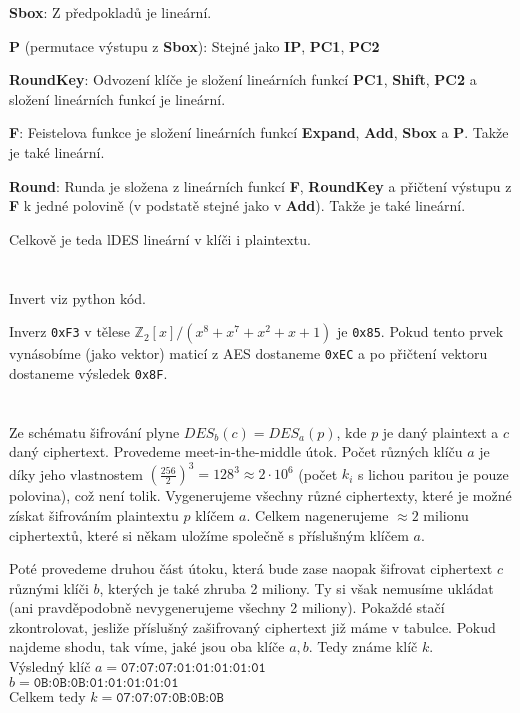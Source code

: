 \documentclass[12pt, a4paper]{article}
\begin{document}
\textbf{Sbox}: Z předpokladů je lineární.

\textbf{P} (permutace výstupu z \textbf{Sbox}): Stejné jako \textbf{IP}, \textbf{PC1}, \textbf{PC2}

\textbf{RoundKey}: Odvození klíče je složení lineárních funkcí \textbf{PC1}, \textbf{Shift}, \textbf{PC2} a složení lineárních funkcí je lineární.

\textbf{F}: Feistelova funkce je složení lineárních funkcí \textbf{Expand}, \textbf{Add}, \textbf{Sbox} a \textbf{P}. Takže je také lineární.

\textbf{Round}: Runda je složena z lineárních funkcí \textbf{F}, \textbf{RoundKey} a přičtení výstupu z \textbf{F} k jedné polovině (v podstatě stejné jako v \textbf{Add}). Takže je také lineární.

Celkově je teda lDES lineární v klíči i plaintextu.



\section{}
Invert viz python kód.


Inverz \texttt{0xF3} v tělese $\mathbb{Z}_2[x]/(x^8+x^7+x^2+x+1)$ je \texttt{0x85}. Pokud tento prvek vynásobíme (jako vektor) maticí z AES dostaneme \texttt{0xEC} a po přičtení vektoru dostaneme výsledek \texttt{0x8F}.

\section{}
Ze schématu šifrování plyne $DES_{b}(c)=DES_{a}(p)$, kde $p$ je daný plaintext a $c$ daný ciphertext. Provedeme meet-in-the-middle útok. Počet různých klíču $a$ je díky jeho vlastnostem $(\frac{256}{2})^3=128^3\approx2\cdot 10^6$ (počet $k_i$ s lichou paritou je pouze polovina), což není tolik. Vygenerujeme všechny různé ciphertexty, které je možné získat šifrováním plaintextu $p$ klíčem $a$. Celkem nagenerujeme $\approx 2$ milionu ciphertextů, které si někam uložíme společně s příslušným klíčem $a$.

Poté provedeme druhou část útoku, která bude zase naopak šifrovat ciphertext $c$ různými klíči $b$, kterých je také zhruba 2 miliony. Ty si však nemusíme ukládat (ani pravděpodobně nevygenerujeme všechny 2 miliony). Pokaždé stačí zkontrolovat, jesliže příslušný zašifrovaný ciphertext již máme v tabulce. Pokud najdeme shodu, tak víme, jaké jsou oba klíče $a,b$. Tedy známe klíč $k$.\\
Výsledný klíč $a = \texttt{07:07:07:01:01:01:01:01}$\\
$b = \texttt{0B:0B:0B:01:01:01:01:01}$\\
Celkem tedy $k = \texttt{07:07:07:0B:0B:0B}$
\end{document}
